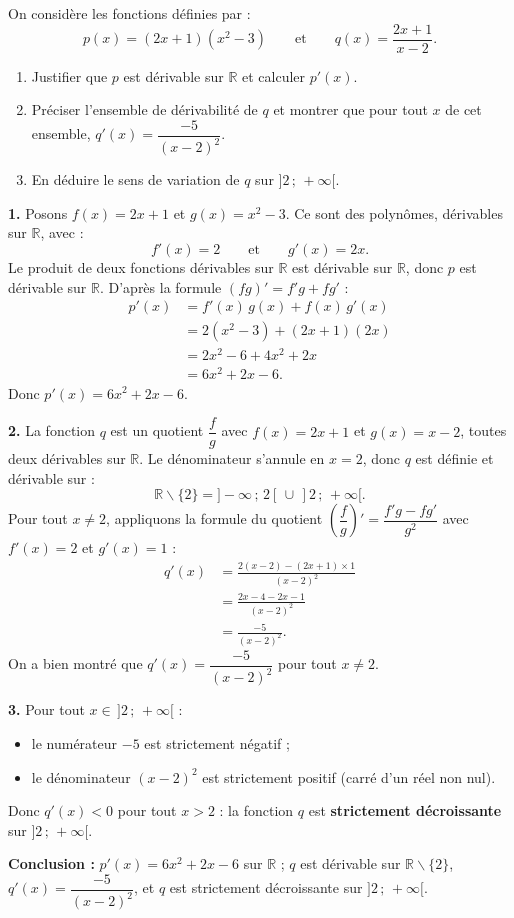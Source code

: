 \documentclass[11pt]{article}
\def\setminus{\mathbin{\backslash}}\let\smallsetminus\setminus
\begin{document}
\begin{exoresolu}
On considère les fonctions définies par :
\[ p(x)=(2x+1)(x^2-3) \qquad\text{et}\qquad q(x)=\frac{2x+1}{x-2}. \]
\begin{enumerate}
\item Justifier que $p$ est dérivable sur $\mathbb{R}$ et calculer $p'(x)$.
\item Préciser l'ensemble de dérivabilité de $q$ et montrer que pour tout $x$ de cet ensemble, $q'(x)=\dfrac{-5}{(x-2)^2}$.
\item En déduire le sens de variation de $q$ sur $]2\,;\,+\infty[$.
\end{enumerate}
\tcblower
\textbf{1.} Posons $f(x)=2x+1$ et $g(x)=x^2-3$. Ce sont des polynômes, dérivables sur $\mathbb{R}$, avec :
\[ f'(x)=2 \qquad\text{et}\qquad g'(x)=2x. \]
Le produit de deux fonctions dérivables sur $\mathbb{R}$ est dérivable sur $\mathbb{R}$, donc $p$ est dérivable sur $\mathbb{R}$. D'après la formule $(fg)'=f'g+fg'$ :
\begin{align*}
p'(x) &= f'(x)\,g(x)+f(x)\,g'(x) \\
&= 2(x^2-3)+(2x+1)(2x) \\
&= 2x^2-6+4x^2+2x \\
&= 6x^2+2x-6.
\end{align*}
Donc $\boxed{p'(x)=6x^2+2x-6}$.

\textbf{2.} La fonction $q$ est un quotient $\dfrac{f}{g}$ avec $f(x)=2x+1$ et $g(x)=x-2$, toutes deux dérivables sur $\mathbb{R}$. Le dénominateur s'annule en $x=2$, donc $q$ est définie et dérivable sur :
\[ \mathbb{R}\setminus\{2\}=]-\infty\,;\,2[\,\cup\,]2\,;\,+\infty[. \]
Pour tout $x\neq 2$, appliquons la formule du quotient $\left(\dfrac{f}{g}\right)'=\dfrac{f'g-fg'}{g^2}$ avec $f'(x)=2$ et $g'(x)=1$ :
\begin{align*}
q'(x) &= \frac{2(x-2)-(2x+1)\times 1}{(x-2)^2} \\
&= \frac{2x-4-2x-1}{(x-2)^2} \\
&= \frac{-5}{(x-2)^2}.
\end{align*}
On a bien montré que $\boxed{q'(x)=\dfrac{-5}{(x-2)^2}}$ pour tout $x\neq 2$.

\textbf{3.} Pour tout $x\in\,]2\,;\,+\infty[$ :
\begin{itemize}
\item le numérateur $-5$ est strictement négatif ;
\item le dénominateur $(x-2)^2$ est strictement positif (carré d'un réel non nul).
\end{itemize}
Donc $q'(x)<0$ pour tout $x>2$ : la fonction $q$ est \textbf{strictement décroissante} sur $]2\,;\,+\infty[$.

\textbf{Conclusion :} $p'(x)=6x^2+2x-6$ sur $\mathbb{R}$ ; $q$ est dérivable sur $\mathbb{R}\setminus\{2\}$, $q'(x)=\dfrac{-5}{(x-2)^2}$, et $q$ est strictement décroissante sur $]2\,;\,+\infty[$.
\end{exoresolu}
\end{document}
